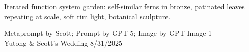 \documentclass[12pt]{article}
\begin{document}
\noindent
\begin{adjustbox}{max size={\textwidth}{\textheight}}
\begin{varwidth}{\textwidth}
\RaggedRight
\footnotesize
Iterated function system garden: self-similar ferns in bronze, patinated leaves repeating at scale, soft rim light, botanical sculpture.
\end{varwidth}
\end{adjustbox}
\vfill
{\raggedleft\footnotesize
Metaprompt by Scott; Prompt by GPT-5; Image by GPT Image 1 \\
Yutong \& Scott's Wedding 8/31/2025\par}
\end{document}
